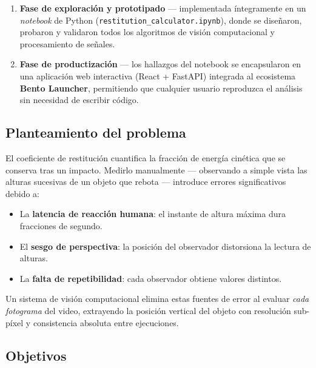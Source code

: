 \documentclass[12pt,a4paper]{article}
\begin{document}
\begin{enumerate}[label=\textbf{\arabic*.}]
    \item \textbf{Fase de exploración y prototipado} — implementada íntegramente en un \textit{notebook} de Python (\texttt{restitution\_calculator.ipynb}), donde se diseñaron, probaron y validaron todos los algoritmos de visión computacional y procesamiento de señales.
    \item \textbf{Fase de productización} — los hallazgos del notebook se encapsularon en una aplicación web interactiva (React + FastAPI) integrada al ecosistema \textbf{Bento Launcher}, permitiendo que cualquier usuario reproduzca el análisis sin necesidad de escribir código.
\end{enumerate}

\subsection{Planteamiento del problema}

El coeficiente de restitución cuantifica la fracción de energía cinética que se conserva tras un impacto. Medirlo manualmente — observando a simple vista las alturas sucesivas de un objeto que rebota — introduce errores significativos debido a:

\begin{itemize}
    \item La \textbf{latencia de reacción humana}: el instante de altura máxima dura fracciones de segundo.
    \item El \textbf{sesgo de perspectiva}: la posición del observador distorsiona la lectura de alturas.
    \item La \textbf{falta de repetibilidad}: cada observador obtiene valores distintos.
\end{itemize}

Un sistema de visión computacional elimina estas fuentes de error al evaluar \textit{cada fotograma} del video, extrayendo la posición vertical del objeto con resolución sub-píxel y consistencia absoluta entre ejecuciones.

\subsection{Objetivos}
\end{document}
